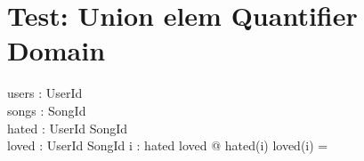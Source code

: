 \documentclass[a4paper,10pt,fleqn]{article}
\begin{document}
\section*{Test: Union elem Quantifier Domain}

\begin{zed}\end{zed}

\begin{axdef}
users : \finset UserId \\
songs : \finset SongId \\
hated : UserId \pfun \finset SongId \\
loved : UserId \pfun \finset SongId
\where
\forall i : \dom hated \cup \dom loved @ hated(i) \cap loved(i) = \emptyset
\end{axdef}
\end{document}
